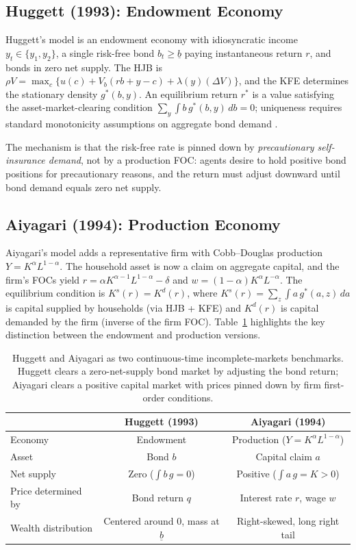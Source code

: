 \documentclass[11pt,a4paper]{report}
\begin{document}
\subsection{Huggett (1993): Endowment Economy}

Huggett's model is an endowment economy with idiosyncratic income $y_t \in \{y_1, y_2\}$, a single risk-free bond $b_t \geq \underline{b}$ paying instantaneous return $r$, and bonds in zero net supply.  The HJB is $\rho V = \max_c\{u(c) + V_b(rb + y - c) + \lambda(y)(\Delta V)\}$, and the KFE determines the stationary density $g^*(b,y)$.  An equilibrium return $r^*$ is a value satisfying the asset-market-clearing condition $\sum_y \int b\,g^*(b,y)\,db = 0$; uniqueness requires standard monotonicity assumptions on aggregate bond demand \citep{achdou2022income}.

The mechanism is that the risk-free rate is pinned down by \emph{precautionary self-insurance demand}, not by a production FOC: agents desire to hold positive bond positions for precautionary reasons, and the return must adjust downward until bond demand equals zero net supply.

\subsection{Aiyagari (1994): Production Economy}

Aiyagari's model adds a representative firm with Cobb--Douglas production $Y = K^\alpha L^{1-\alpha}$.  The household asset is now a claim on aggregate capital, and the firm's FOCs yield $r = \alpha K^{\alpha-1}L^{1-\alpha} - \delta$ and $w = (1-\alpha)K^\alpha L^{-\alpha}$.  The equilibrium condition is $K^s(r) = K^d(r)$, where $K^s(r) = \sum_z \int a\,g^*(a,z)\,da$ is capital supplied by households (via HJB + KFE) and $K^d(r)$ is capital demanded by the firm (inverse of the firm FOC).  Table~\ref{tab:huggett_aiyagari_ct} highlights the key distinction between the endowment and production versions.

\begin{table}[ht]
\centering
\small
\begin{tabular}{lcc}
\toprule
& \textbf{Huggett (1993)} & \textbf{Aiyagari (1994)} \\
\midrule
Economy & Endowment & Production ($Y = K^\alpha L^{1-\alpha}$) \\
Asset & Bond $b$ & Capital claim $a$ \\
Net supply & Zero ($\int b\,g = 0$) & Positive ($\int a\,g = K > 0$) \\
Price determined by & Bond return $q$ & Interest rate $r$, wage $w$ \\
Wealth distribution & Centered around $0$, mass at $\underline{b}$ & Right-skewed, long right tail \\
\bottomrule
\end{tabular}
\caption{Huggett and Aiyagari as two continuous-time incomplete-markets benchmarks.  Huggett clears a zero-net-supply bond market by adjusting the bond return; Aiyagari clears a positive capital market with prices pinned down by firm first-order conditions.}
\label{tab:huggett_aiyagari_ct}
\end{table}
\end{document}
